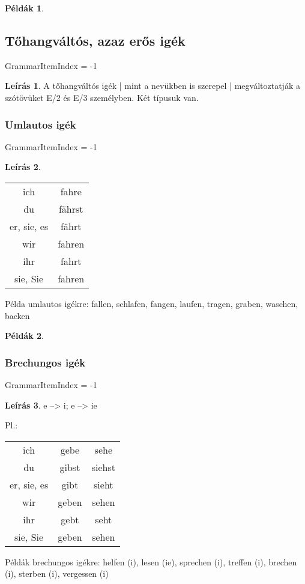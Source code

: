 \documentclass{article}
\theoremstyle{definition}
\newtheorem*{exmp}{Példák}
\newtheorem*{desc}{Leírás}
\begin{document}
\begin{exmp}
\end{exmp}

\subsection{Tőhangváltós, azaz erős igék}

GrammarItemIndex = -1

\begin{desc}
A tőhangváltós igék | mint a nevükben is szerepel | megváltoztatják a szótövüket E/2 és E/3 személyben. Két típusuk van.
\end{desc}

\subsubsection{Umlautos igék}

GrammarItemIndex = -1

\begin{desc}
\begin{tabular}{cc}
 ich & fahre \\
 du & fährst \\
 er, sie, es & fährt \\
 wir & fahren \\
 ihr & fahrt \\
 sie, Sie & fahren \\
\end{tabular}

Példa umlautos igékre: fallen, schlafen, fangen, laufen, tragen, graben, waschen, backen
\end{desc}

\begin{exmp}
\end{exmp}

\subsubsection{Brechungos igék}

GrammarItemIndex = -1

\begin{desc}
e --> i; e --> ie

Pl.:

\begin{tabular}{ccc}
 ich & gebe & sehe \\
 du & gibst & siehst\\
 er, sie, es & gibt & sieht \\
 wir & geben & sehen \\
 ihr & gebt & seht \\
 sie, Sie & geben & sehen \\
\end{tabular}

Példák brechungos igékre: helfen (i), lesen (ie), sprechen (i), treffen (i), brechen (i), sterben (i), vergessen (i)
\end{desc}
\end{document}
